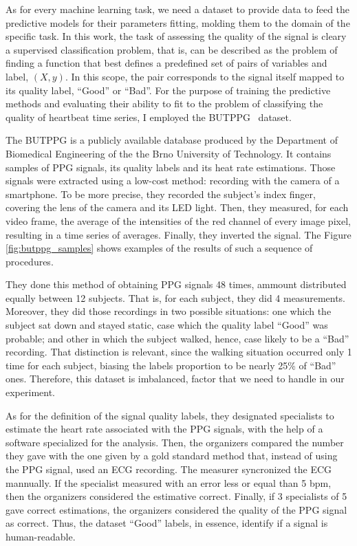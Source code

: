 As for every machine learning task, we need a dataset to provide data to feed the predictive models for their parameters fitting, molding them to the domain of the specific task. In this work, the task of assessing the quality of the signal is cleary a supervised classification problem, that is, can be described as the problem of finding a function that best defines a predefined set of pairs of variables and label, $(X,y)$. In this scope, the pair corresponds to the signal itself mapped to its quality label, ``Good'' or ``Bad''. For the purpose of training the predictive methods and evaluating their ability to fit to the problem of classifying the quality of heartbeat time series, I employed the \acrshort{BUTPPG}~\cite{butppg} dataset.



The \acrfull{BUTPPG} is a publicly available database produced by the Department of Biomedical Engineering of the the Brno University of Technology. It contains samples of \acrshort{PPG} signals, its quality labels and its heat rate estimations. Those signals were extracted using a low-cost method: recording with the camera of a smartphone. To be more precise, they recorded the subject's index finger, covering the lens of the camera and its LED light. Then, they measured, for each video frame, the average of the intensities of the red channel of every image pixel, resulting in a time series of averages. Finally, they inverted the signal. The Figure \ref{fig:butppg_samples} shows examples of the results of such a sequence of procedures.  

They done this method of obtaining \acrshort{PPG} signals  48 times, ammount distributed equally between 12 subjects. That is, for each subject, they did 4 measurements. Moreover, they did those recordings in two possible situations: one which the subject sat down and stayed static, case which the quality label ``Good'' was probable; and other in which the subject walked, hence, case likely to be a ``Bad'' recording. That distinction is relevant, since the walking situation occurred only 1 time for each subject, biasing the labels proportion to be nearly 25\% of ``Bad'' ones. Therefore, this dataset is imbalanced, factor that we need to handle in our experiment.

As for the definition of the signal quality labels, they designated specialists to estimate the heart rate associated with the \acrshort{PPG} signals, with the help of a software specialized for the analysis. Then, the organizers compared the number they gave with the one given by a gold standard method that, instead of using the \acrshort{PPG} signal, used an ECG recording. The measurer syncronized the ECG mannually. If the specialist measured with an error less or equal than 5 bpm, then the organizers considered the estimative correct. Finally, if 3 specialists of 5 gave correct estimations, the organizers considered the quality of the \acrshort{PPG} signal as correct. Thus, the dataset ``Good'' labels, in essence, identify if a signal is human-readable. 

